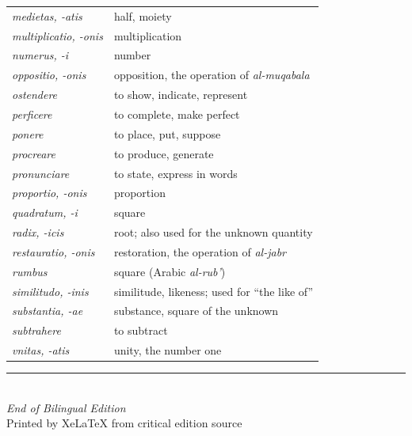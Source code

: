 \documentclass[11pt,a4paper,twoside]{book}
\begin{document}
\begin{longtable}{p{}p{}}
\textit{medietas, -atis} & half, moiety \\
\textit{multiplicatio, -onis} & multiplication \\
\textit{numerus, -i} & number \\
\textit{oppositio, -onis} & opposition, the operation of \textit{al-muqabala} \\
\textit{ostendere} & to show, indicate, represent \\
\textit{perficere} & to complete, make perfect \\
\textit{ponere} & to place, put, suppose \\
\textit{procreare} & to produce, generate \\
\textit{pronunciare} & to state, express in words \\
\textit{proportio, -onis} & proportion \\
\textit{quadratum, -i} & square \\
\textit{radix, -icis} & root; also used for the unknown quantity \\
\textit{restauratio, -onis} & restoration, the operation of \textit{al-jabr} \\
\textit{rumbus} & square (Arabic \textit{al-rub'}) \\
\textit{similitudo, -inis} & similitude, likeness; used for ``the like of'' \\
\textit{substantia, -ae} & substance, square of the unknown \\
\textit{subtrahere} & to subtract \\
\textit{vnitas, -atis} & unity, the number one \\
\bottomrule
\end{longtable}

\vfill
\begin{center}
\rule{0.5\textwidth}{0.4pt}\\[0.5cm]
{\small\textit{End of Bilingual Edition}}\\[0.3cm]
{\small Printed by XeLaTeX from critical edition source}
\end{center}
\end{document}
